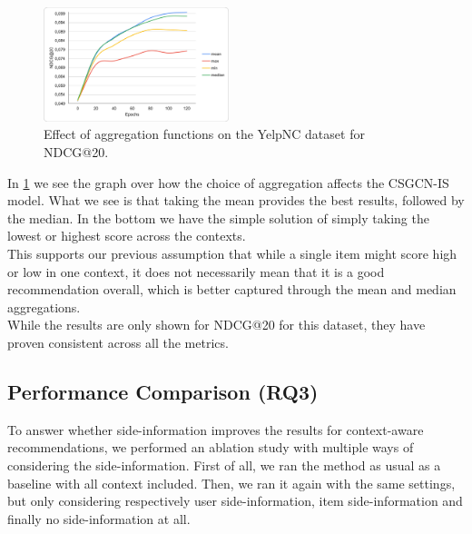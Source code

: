 \begin{figure}[hbt!]
	\centering
	\small	
	\includegraphics[width=0.48\textwidth]{figures/aggregation_effect.png}\vspace{-5pt}
	\caption{Effect of aggregation functions on the YelpNC dataset for NDCG@20.}\vspace{-10pt}
	\label{fig:aggregation_effect}
\end{figure}

In \cref{fig:aggregation_effect} we see the graph over how the choice of aggregation affects the CSGCN-IS model.
What we see is that taking the mean provides the best results, followed by the median.
In the bottom we have the simple solution of simply taking the lowest or highest score across the contexts.\\
This supports our previous assumption that while a single item might score high or low in one context, it does not necessarily mean that it is a good recommendation overall, which is better captured through the mean and median aggregations.\\
While the results are only shown for NDCG@20 for this dataset, they have proven consistent across all the metrics.



\subsection{Performance Comparison (RQ3)}
To answer whether side-information improves the results for context-aware recommendations, we performed an ablation study with multiple ways of considering the side-information.
First of all, we ran the method as usual as a baseline with all context included.
Then, we ran it again with the same settings, but only considering respectively user side-information, item side-information and finally no side-information at all.
